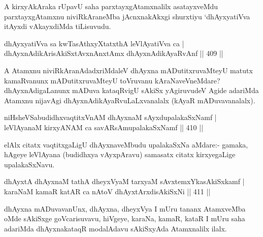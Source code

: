 \begin{artha}
A kirxyAkAraka rUpavU saha parxtayxgAtamxnalilx asatayxveMdu parxtayxgAtamxnu niviRkAraneMba jAcnxnakAkxgi shurxtiyu `dhAyxyatiVva itAyxdi vAkayxdiMda tiLisuvudu.
\end{artha}

\begin{shl}
dhAyxyatiVva sa kwTasAthxyXtatxthA leVlAyatiVva ca | \\
dhAyxnAdikArisAkiSxtAvxnAnx\s \s tAmx dhAyxnAdikAyaRvAnf \hfill||  409 ||  
\end{shl}

\begin{artha}
A Atamxnu niviRkAranAdadxriMdaleV dhAyxna mADutitxruvaMteyU matutx kamaRvanunx mADutitxruvaMteyU toVruvanu kAraNaveVneMdare? dhAyxnAdigaLanunx mADuva kataqRvigU sAkiSx yAgiruvudeV Agide adariMda Atamxnu nijavAgi dhAyxnAdikAyaRvuLaLxvanalalx (kAyaR mADuvavanalalx).
\end{artha}


\begin{shl}
niHsheVSabudidhxvaqtitxVnAM dhAyxnaM sAyxdupalakaSxNamf | \\
leVlAyanaM kirxyANAM ca savARsAmupalakaSxNamf \hfill||  410 ||  
\end{shl}

\begin{artha}
elAlx citatx vaqtitxgaLigU dhAyxnaveMbudu upalakaSxNa aMdare:- gamaka, hAgeye leVlAyana (budidhxya vAyxpAravu) samasatx citatx kirxyegaLige upalakaSxNavu.
\end{artha}


\begin{shl}
dhAyxtA dhAyxnaM tathA dheyxVyaM tarxyaM sAvxtemxYkasAkiSxkamf | \\
karaNaM kamaR katAR ca nAtoV dhAyxtArxdisAkiSxNi \hfill||  411 ||  
\end{shl}

\begin{artha}
dhAyxna mADuvavanUnx, dhAyxna, dheyxVya I mUru tananx AtamxveMba oMde sAkiSxge goVcarisuvavu, hiVgeye, karaNa, kamaR, kataR I mUru saha adariMda dhAyxnakataqR modalAdavu sAkiSxyAda Atamxnalilx ilalx.
\end{artha}


